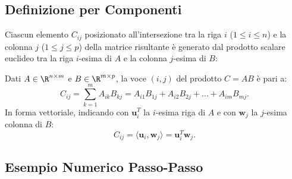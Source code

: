 \subsection{Definizione per Componenti}

Ciascun elemento $C_{ij}$ posizionato all'intersezione tra la riga $i$ ($1 \le i \le n$) e la colonna $j$ ($1 \le j \le p$) della matrice risultante \`e generato dal prodotto scalare euclideo tra la riga $i$-esima di $A$ e la colonna $j$-esima di $B$:

\begin{definition}
Dati $A \in \R^{n \times m}$ e $B \in \R^{m \times p}$, la voce $(i,j)$ del prodotto $C = AB$ \`e pari a:
\begin{equation}
    C_{ij} = \sum_{k=1}^m A_{ik} B_{kj} = A_{i1}B_{1j} + A_{i2}B_{2j} + \dots + A_{im}B_{mj}.
\end{equation}
In forma vettoriale, indicando con $\mathbf{u}_i^T$ la $i$-esima riga di $A$ e con $\mathbf{w}_j$ la $j$-esima colonna di $B$:
\begin{equation}
    C_{ij} = \langle \mathbf{u}_i, \mathbf{w}_j \rangle = \mathbf{u}_i^T \mathbf{w}_j.
\end{equation}
\end{definition}

\subsection{Esempio Numerico Passo-Passo}

